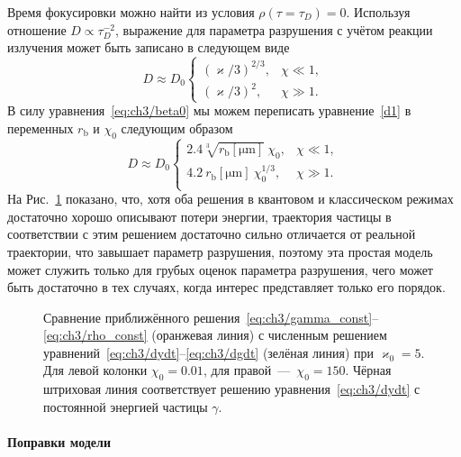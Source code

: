 Время фокусировки можно найти из условия $\rho(\tau = \tau_D) = 0 $.
Используя отношение $D\propto \tau_D^{-2}$, выражение для параметра разрушения с учётом реакции излучения может быть записано в следующем виде
\begin{equation}
    \label{eq:ch3/dratio_simple}
    D \approx D_0 
    \begin{cases}
    \left( \varkappa /3 \right)^{2/3} , & \chi \ll 1, \\
    \left( \varkappa /3 \right)^2, &  \chi \gg 1.
    \end{cases}
\end{equation}
В силу уравнения~\eqref{eq:ch3/beta0} мы можем переписать уравнение~\eqref{d1} в переменных $r_\mathrm{b}$ и $\chi_0$ следующим образом
\begin{equation}
    D \approx 
    D_0  \begin{cases}
        2.4 \sqrt[3]{r_\mathrm{b}[\si{\um}]}\ \chi_0, & \chi \ll 1, \\
        4.2 \ r_\mathrm{b}[\si{\um}]\ \chi_0^{1/3}, & \chi \gg 1. \\
    \end{cases}
\end{equation}
На Рис.~\ref{fig:ch3/sec2/motionless} показано, что, хотя оба решения в квантовом и классическом режимах достаточно хорошо описывают потери энергии, траектория частицы в соответствии с этим решением достаточно сильно отличается от реальной траектории, что завышает параметр разрушения, поэтому эта простая модель может служить только для грубых оценок параметра разрушения, чего может быть достаточно в тех случаях, когда интерес представляет только его порядок.

\begin{figure}
    \caption[Сравнение аналитического и численного решений уравнений движения частиц при столкновении пучков в режиме преобладания излучения]{\label{fig:ch3/sec2/motionless} 
    Сравнение приближённого решения~\eqref{eq:ch3/gamma_const}--\eqref{eq:ch3/rho_const} (оранжевая линия) с численным решением уравнений~\eqref{eq:ch3/dydt}--\eqref{eq:ch3/dgdt} (зелёная линия) при $\varkappa_0=5$. Для левой колонки $\chi_0=0.01$, для правой~---~$\chi_0=150$. Чёрная штриховая линия соответствует решению уравнения~\eqref{eq:ch3/dydt} с постоянной энергией частицы $\gamma$.}
\end{figure}

\paragraph{Поправки модели}

